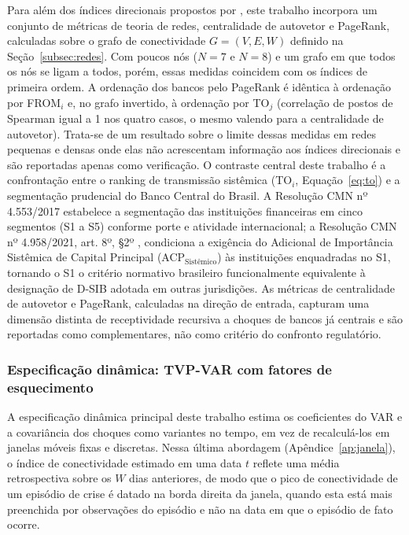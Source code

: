 \documentclass[12pt, a4paper, oneside, english, brazil]{abntex2}
\begin{document}
Para além dos índices direcionais propostos por \textcite{diebold2012}, este trabalho
incorpora um conjunto de métricas de teoria de redes, centralidade de autovetor e
PageRank, calculadas sobre o grafo de conectividade $G = (V, E, W)$ definido na
Seção~\ref{subsec:redes}. Com poucos nós ($N=7$ e $N = 8$) e um grafo em que todos os nós se ligam a todos,
porém, essas medidas coincidem com os índices de primeira ordem. A ordenação
dos bancos pelo PageRank é idêntica à ordenação por FROM$_i$ e, no grafo
invertido, à ordenação por TO$_j$ (correlação de postos de Spearman igual a 1
nos quatro casos, o mesmo valendo para a centralidade de autovetor). Trata-se
de um resultado sobre o limite dessas medidas em redes pequenas e densas onde elas
não acrescentam informação aos índices direcionais e são reportadas apenas
como verificação. O contraste central deste trabalho é a confrontação entre o ranking de
transmissão sistêmica (TO$_i$, Equação~\ref{eq:to}) e a segmentação
prudencial do Banco Central do Brasil. A Resolução CMN nº 4.553/2017
\parencite{cmn4553_2017} estabelece a segmentação das instituições
financeiras em cinco segmentos (S1 a S5) conforme porte e atividade
internacional; a Resolução CMN nº 4.958/2021, art. 8º, §2º
\parencite{cmn4958_2021}, condiciona a exigência do Adicional de Importância
Sistêmica de Capital Principal (ACP$_{\text{Sistêmico}}$) às instituições
enquadradas no S1, tornando o S1 o critério normativo brasileiro
funcionalmente equivalente à designação de D-SIB adotada em outras
jurisdições. As métricas de centralidade de autovetor e PageRank,
calculadas na direção de entrada, capturam uma dimensão distinta de
receptividade recursiva a choques de bancos já centrais e são reportadas
como complementares, não como critério do confronto regulatório.

\subsubsection*{Especificação dinâmica: TVP-VAR com fatores de esquecimento}
\label{sec:tvpvar}

A especificação dinâmica principal deste trabalho estima os coeficientes do
VAR e a covariância dos choques como variantes no tempo, em vez de
recalculá-los em janelas móveis fixas e discretas. Nessa última abordagem (Apêndice~\ref{ap:janela}), o índice de conectividade estimado em uma data $t$
reflete uma média retrospectiva sobre os $W$ dias anteriores, de modo que o
pico de conectividade de um episódio de crise é datado na borda direita da
janela, quando esta está mais preenchida por observações do episódio e
não na data em que o episódio de fato ocorre.
\end{document}
